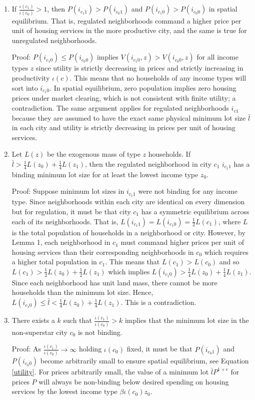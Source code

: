 \documentclass[11pt]{article}
\begin{document}
	\begin{enumerate}
		\item	If $\frac{\iota(c_{1})}{\iota(c_{0})} > 1$, then $P(i_{c_{1}1}) > P(i_{c_{0}1})$ and  $P(i_{c_{1}0}) > P(i_{c_{0}0})$ in spatial equilibrium. That is, regulated neighborhoods command a higher price per unit of housing services in the more productive city, and the same is true for unregulated neighborhoods. 
		
		Proof: $P(i_{c_{1}0}) \leq P(i_{c_{0}0})$ implies $V(i_{c_{1}0}, z) > V(i_{c_{0}0}, z)$ for all income types $z$ since utility is strictly decreasing in prices and strictly increasing in productivity $\iota(c)$. This means that no households of any income types will sort into $i_{c_{1}0}$. In spatial equilibrium, zero population implies zero housing prices under market clearing, which is not consistent with finite utility; a contradiction. The same argument applies for regulated neighborhoods $i_{c1}$ because they are assumed to have the exact same physical minimum lot size $\bar{l}$ in each city and utility is strictly decreasing in prices per unit of housing services.
		
		\item Let $L(z)$ be the exogenous mass of type $z$ households. If $\bar{l} > \frac{1}{4}L(z_{0}) + \frac{1}{4}L(z_{1})$, then the regulated neighborhood in city $c_{1}$ $i_{c_{1}1}$ has a binding minimum lot size for at least the lowest income type $z_{0}$.
		
		Proof: Suppose minimum lot sizes in $i_{c_{1}1}$ were not binding for any income type. Since neighborhoods within each city are identical on every dimension but for regulation, it must be that city $c_{1}$ has a symmetric equilibrium across each of its neighborhoods. That is, $L(i_{c_{1}1}) = L(i_{c_{1}0}) = \frac{1}{2}L(c_{1})$, where $L$ is the total population of households in a neighborhood or city. However, by Lemma 1, each neighborhood in $c_{1}$ must command higher prices per unit of housing services than their corresponding neighborhoods in $c_{0}$ which requires a higher total population in $c_{1}$. This means that $L(c_{1}) > L(c_{0})$ and so $L(c_{1}) > \frac{1}{2}L(z_{0}) + \frac{1}{2}L(z_{1})$ which implies $L(i_{c_{1}0}) > \frac{1}{4}L(z_{0}) + \frac{1}{4}L(z_{1})$. Since each neighborhood has unit land mass, there cannot be more households than the minimum lot size. Hence, $L(i_{c_{1}0}) \leq \bar{l} < \frac{1}{4}L(z_{0}) + \frac{1}{4}L(z_{1})$. This is a contradiction.
		
		\item There exists a $k$ such that $\frac{\iota(c_{1})}{\iota(c_{0})} > k$ implies that the minimum lot size in the non-superstar city $c_{0}$ is not binding. 
		
		Proof: As $\frac{\iota(c_{1})}{\iota(c_{0})} \to \infty$ holding $\iota(c_{0})$ fixed, it must be that $P(i_{c_{0}1})$ and $P(i_{c_{0}0})$ become arbitrarily small to ensure spatial equilibrium, see Equation \eqref{utility}. For prices arbitrarily small, the value of a minimum lot $\bar{l}P^{1 + \epsilon}$ for prices $P$ will always be non-binding below desired spending on housing services by the lowest income type $\beta \iota(c_{0}) z_{0}$. 
		
	\end{enumerate}
\end{document}
